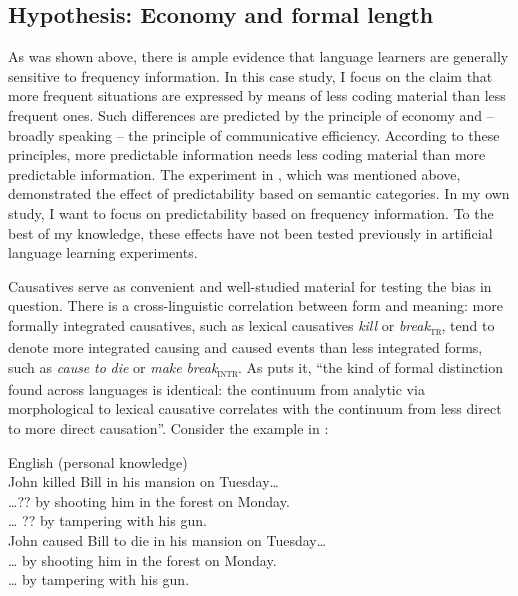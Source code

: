 \documentclass[output=paper]{langsci/langscibook}
\begin{document}
\subsection{Hypothesis: Economy and formal length}

As was shown above, there is ample evidence that language learners are generally sensitive to frequency information. In this case study, I focus on the claim that more frequent situations are expressed by means of less coding material than less frequent ones. Such differences are predicted by the principle of economy and – broadly speaking – the principle of communicative efficiency. According to these principles, more predictable information needs less coding material than more predictable information. The experiment in \citet{FedzechkinaEtAl2012}, which was mentioned above, demonstrated the effect of predictability based on semantic categories. In my own study, I want to focus on predictability based on frequency information. To the best of my knowledge, these effects have not been tested previously in artificial language learning experiments. 

Causatives serve as convenient and well-studied material for testing the bias in question. There is a cross-linguistic correlation between form and meaning: more formally integrated causatives, such as lexical causatives \textit{kill} or \textit{break}\textsc{\textsubscript{tr}}, tend to denote more integrated causing and caused events than less integrated forms, such as \textit{cause} \textit{to} \textit{die} or \textit{make} \textit{break}\textsc{\textsubscript{intr}}. As \citet[165]{Comrie1981} puts it, “the kind of formal distinction found across languages is identical: the continuum from analytic via morphological to lexical causative correlates with the continuum from less direct to more direct causation”. Consider the example in :

\ea\label{ex:levshina:1}
{English (personal knowledge)}\\ 
  \ea John killed Bill in his mansion on Tuesday… \\
    \ea …?? by shooting him in the forest on Monday.\\
    \ex … ?? by tampering with his gun.\\
    \z
  \ex  John caused Bill to die in his mansion on Tuesday…\\
    \ea … by shooting him in the forest on Monday.\\
    \ex … by tampering with his gun.\\
    \z
  \z
\z
\end{document}
